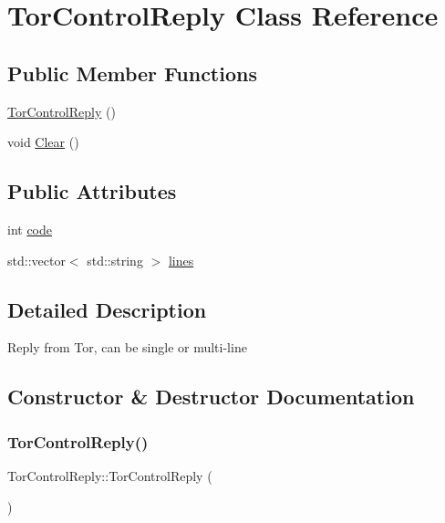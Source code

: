 \hypertarget{class_tor_control_reply}{}\section{Tor\+Control\+Reply Class Reference}
\label{class_tor_control_reply}
\subsection*{Public Member Functions}
\begin{DoxyCompactItemize}
\item 
\mbox{\hyperlink{class_tor_control_reply_ab5c628e8a4d39785df76d845169daf92}{Tor\+Control\+Reply}} ()
\item 
void \mbox{\hyperlink{class_tor_control_reply_a94cbd96ffa94322e84ea47daa8ca62bb}{Clear}} ()
\end{DoxyCompactItemize}
\subsection*{Public Attributes}
\begin{DoxyCompactItemize}
\item 
int \mbox{\hyperlink{class_tor_control_reply_aba46f4c0571808c99097edd3246c2f6a}{code}}
\item 
std\+::vector$<$ std\+::string $>$ \mbox{\hyperlink{class_tor_control_reply_ae9c09a2c2d674c1554c91ace852e5269}{lines}}
\end{DoxyCompactItemize}


\subsection{Detailed Description}
Reply from Tor, can be single or multi-\/line 

\subsection{Constructor \& Destructor Documentation}
\mbox{\label{class_tor_control_reply_ab5c628e8a4d39785df76d845169daf92}} 
\subsubsection{\texorpdfstring{Tor\+Control\+Reply()}{TorControlReply()}}
{\footnotesize\ttfamily Tor\+Control\+Reply\+::\+Tor\+Control\+Reply (\begin{DoxyParamCaption}{ }\end{DoxyParamCaption})\hspace{0.3cm}{\ttfamily [inline]}}



